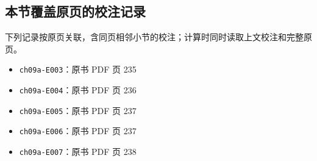 \documentclass[
  10pt,
  fontset=fandol]{ctexart}
\providecommand{\tightlist}{%
  \setlength{\itemsep}{0pt}\setlength{\parskip}{0pt}}
\begin{document}
\subsection{本节覆盖原页的校注记录}\label{ux672cux8282ux8986ux76d6ux539fux9875ux7684ux6821ux6ce8ux8bb0ux5f55}

下列记录按原页关联，含同页相邻小节的校注；计算时同时读取上文校注和完整原页。

\begin{itemize}
\tightlist
\item
  \texttt{ch09a-E003}：原书 PDF 页 235
\item
  \texttt{ch09a-E004}：原书 PDF 页 236
\item
  \texttt{ch09a-E005}：原书 PDF 页 237
\item
  \texttt{ch09a-E006}：原书 PDF 页 237
\item
  \texttt{ch09a-E007}：原书 PDF 页 238
\end{itemize}
\end{document}
